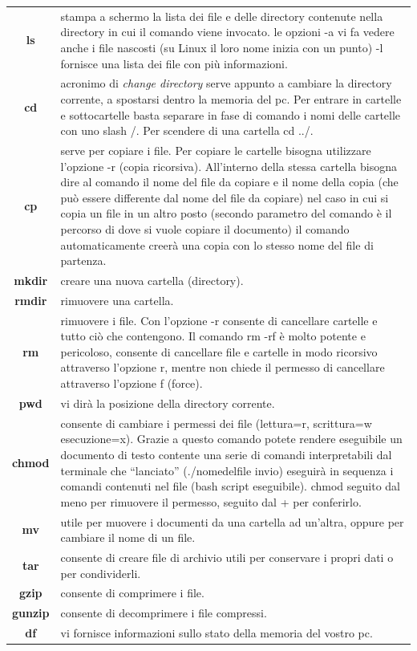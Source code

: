 \documentclass[11pt,fleqn]{book} %
\begin{document}
\begin{table}[h]
\begin{tabular}{cp{10cm}}
\textbf{ls} & stampa a schermo la lista dei file e delle directory contenute nella directory in cui il comando viene invocato. le opzioni -a vi fa vedere anche i file nascosti (su Linux il loro nome inizia con un punto) -l fornisce una lista dei file con più informazioni.\\
\textbf{cd} & acronimo di \textit{change directory} serve appunto a cambiare la directory corrente, a spostarsi dentro la memoria del pc. Per entrare in cartelle e sottocartelle basta separare in fase di comando i nomi delle cartelle con uno slash /. Per scendere di una cartella cd ../.\\
\textbf{cp} & serve per copiare i file. Per copiare le cartelle bisogna utilizzare 	l'opzione -r (copia ricorsiva). All'interno della stessa cartella bisogna dire al comando il nome del file da copiare e il nome della copia (che può essere differente dal nome del file da copiare) nel caso in cui si copia un file in un altro posto (secondo parametro del comando è il percorso di dove si vuole copiare il documento) il comando automaticamente creerà una copia con lo stesso nome del file di partenza.\\
\textbf{mkdir} & creare una nuova cartella (directory).\\
\textbf{rmdir} & rimuovere una cartella.\\
\textbf{rm} & rimuovere i file. Con l'opzione -r consente di cancellare cartelle e tutto ciò che contengono. Il comando rm -rf è molto potente e pericoloso, consente di cancellare file e cartelle in modo ricorsivo attraverso l'opzione r, mentre non chiede il permesso di cancellare attraverso l'opzione f (force).\\
\textbf{pwd} & vi dirà la posizione della directory corrente.\\
\textbf{chmod} & consente di cambiare i permessi dei file (lettura=r, scrittura=w esecuzione=x). Grazie a questo comando potete rendere eseguibile un documento di testo contente una serie di comandi interpretabili dal terminale che ``lanciato'' (./nomedelfile invio)  eseguirà in sequenza i comandi contenuti nel file (bash script eseguibile). chmod seguito dal meno per rimuovere il permesso, seguito dal + per conferirlo.\\
\textbf{mv} & utile per muovere i documenti da una cartella ad un'altra, oppure per cambiare il nome di un file. \\
\textbf{tar} & consente di creare file di archivio utili per conservare i propri dati o per condividerli. \\
\textbf{gzip} & consente di comprimere i file. \\
\textbf{gunzip} & consente di decomprimere i file compressi. \\
\textbf{df} & vi fornisce informazioni sullo stato della memoria del vostro pc.\\
\end{tabular}
\end{table}
\end{document}
